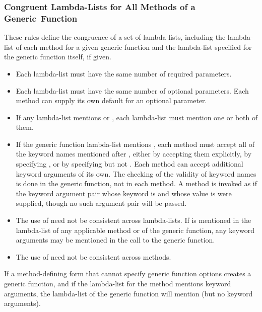 \subsubsection{Congruent Lambda-Lists for All Methods of a \hfil{}\relax Generic~Function}
\label{Congruent-Lambda-Lists-for-All-Methods-of-a-Generic-Function-SECTION}

These rules define the congruence of a set of lambda-lists, including the
lambda-list of each method for a given generic function and the
lambda-list specified for the generic function itself, if given.

\begin{itemize}

\item Each lambda-list must have the same number of required
parameters.

\item Each lambda-list must have the same number of optional
parameters.  Each method can supply its own default for an optional
parameter.

\item If any lambda-list mentions  or , each
lambda-list must mention one or both of them.

\item If the generic function lambda-list mentions , each
method must accept all of the keyword names mentioned after ,
either by accepting them explicitly, by specifying 
, or by specifying  but not .
Each method can accept additional keyword arguments of its own.  The
checking of the validity of keyword names is done in the generic
function, not in each method. A method is invoked as if the keyword
argument pair whose  keyword is  and whose value
is  were supplied, though no such argument pair will be passed.

\item The use of  need not be consistent
across lambda-lists.  If  is mentioned in 
the lambda-list of any applicable method or of the generic function,
any keyword arguments may be mentioned in the call to the
generic function.

\item The use of  need not be consistent across methods.
\end{itemize}


If a method-defining form that cannot specify generic function options
creates a generic function, and if the lambda-list for the method
mentions keyword arguments, the lambda-list of the generic function
will mention  (but no keyword arguments).


